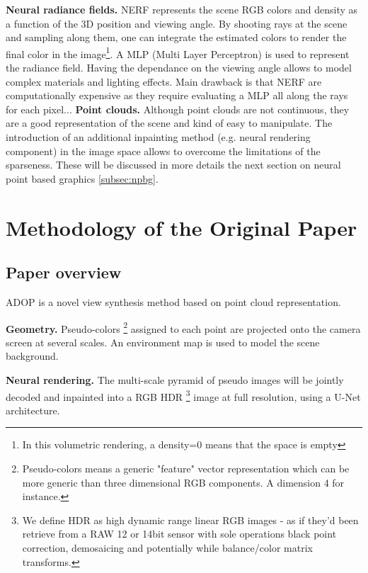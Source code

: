 \noindent\textbf{Neural radiance fields.} NERF \cite{mildenhall2020nerf} represents the scene RGB colors and density as a function of the 3D position and viewing angle. By shooting rays at the scene and sampling along them, one can integrate the estimated colors to render the final color in the image\footnote{In this volumetric rendering, a density=0 means that the space is empty}. A MLP (Multi Layer Perceptron) is used to represent the radiance field. Having the dependance on the viewing angle allows to model complex materials and lighting effects. Main drawback is that NERF are computationally expensive as they require evaluating a MLP all along the rays for each pixel...
\noindent\textbf{Point clouds.} Although point clouds are not continuous, they are a good representation of the scene and kind of easy to manipulate. The introduction of an additional inpainting method (e.g. neural rendering component) in the image space allows to overcome the limitations of the sparseness. These will be discussed in more details the next section on neural point based graphics \ref{subsec:npbg}.



\section{Methodology of the Original Paper}
\label{sec:methodology_paper}

\subsection{Paper overview}
\label{subsec:paper_overview}
ADOP \cite{Aruckert2022adop} is a novel view synthesis method based on point cloud representation. 

\noindent\textbf{Geometry.} Pseudo-colors  \footnote{Pseudo-colors means a generic "feature" vector representation which can be more generic than three dimensional RGB components. A dimension 4 for instance.} assigned to each point are projected onto the camera screen at several scales. An environment map is used to model the scene background.

\noindent\textbf{Neural rendering.} The multi-scale pyramid of pseudo images will be jointly decoded and inpainted into a RGB HDR \footnote{We define HDR as high dynamic range linear RGB images - as if they'd been retrieve from a RAW 12 or 14bit sensor with sole operations black point correction, demosaicing and potentially while balance/color matrix transforms.} image at full resolution, using a U-Net architecture.

